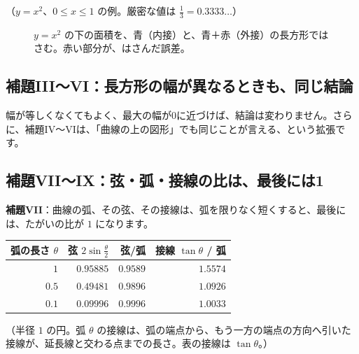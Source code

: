 \documentclass[a4paper,11pt,openany]{ltjsbook}
\begin{document}
（$y=x^2$、$0\le x\le1$ の例。厳密な値は $\frac13=0.3333\ldots$）

\begin{figure}[htbp]
\centering
{}
\caption{$y=x^2$ の下の面積を、青（内接）と、青＋赤（外接）の長方形ではさむ。赤い部分が、はさんだ誤差。}
\end{figure}

\subsection{補題III〜VI：長方形の幅が異なるときも、同じ結論}

幅が等しくなくてもよく、最大の幅が0に近づけば、結論は変わりません。さらに、補題IV〜VIは、「曲線の上の図形」でも同じことが言える、という拡張です。

\subsection{補題VII〜IX：弦・弧・接線の比は、最後には1}

\textbf{補題VII}：曲線の弧、その弦、その接線は、弧を限りなく短くすると、最後には、たがいの比が $1$ になります。

\begin{center}
\begin{tabular}{rrrr}
\toprule
弧の長さ $\theta$ & 弦 $2\sin\frac\theta2$ & 弦/弧 & 接線 $\tan\theta$ / 弧\\
\midrule
$1$ & $0.95885$ & $0.9589$ & $1.5574$\\
$0.5$ & $0.49481$ & $0.9896$ & $1.0926$\\
$0.1$ & $0.09996$ & $0.9996$ & $1.0033$\\
\bottomrule
\end{tabular}
\end{center}

（半径 $1$ の円。弧 $\theta$ の接線は、弧の端点から、もう一方の端点の方向へ引いた接線が、延長線と交わる点までの長さ。表の接線は $\tan\theta$。）
\end{document}
